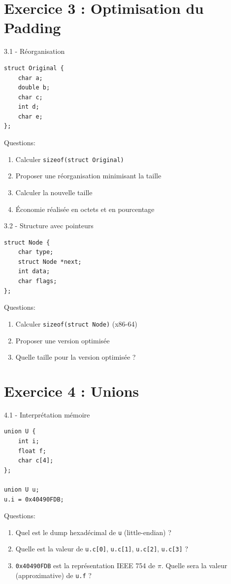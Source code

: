 \documentclass[10pt,a4paper]{article}
\begin{document}
\section{Exercice 3 : Optimisation du Padding}

\begin{exercicebox}{3.1 - Réorganisation}
\begin{lstlisting}
struct Original {
    char a;
    double b;
    char c;
    int d;
    char e;
};
\end{lstlisting}

Questions:
\begin{enumerate}
\item Calculer \texttt{sizeof(struct Original)}
\item Proposer une réorganisation minimisant la taille
\item Calculer la nouvelle taille
\item Économie réalisée en octets et en pourcentage
\end{enumerate}
\end{exercicebox}

\begin{exercicebox}{3.2 - Structure avec pointeurs}
\begin{lstlisting}
struct Node {
    char type;
    struct Node *next;
    int data;
    char flags;
};
\end{lstlisting}

Questions:
\begin{enumerate}
\item Calculer \texttt{sizeof(struct Node)} (x86-64)
\item Proposer une version optimisée
\item Quelle taille pour la version optimisée ?
\end{enumerate}
\end{exercicebox}

\section{Exercice 4 : Unions}

\begin{exercicebox}{4.1 - Interprétation mémoire}
\begin{lstlisting}
union U {
    int i;
    float f;
    char c[4];
};

union U u;
u.i = 0x40490FDB;
\end{lstlisting}

Questions:
\begin{enumerate}
\item Quel est le dump hexadécimal de \texttt{u} (little-endian) ?
\item Quelle est la valeur de \texttt{u.c[0]}, \texttt{u.c[1]}, \texttt{u.c[2]}, \texttt{u.c[3]} ?
\item \texttt{0x40490FDB} est la représentation IEEE 754 de $\pi$. Quelle sera la valeur (approximative) de \texttt{u.f} ?
\end{enumerate}
\end{exercicebox}
\end{document}
